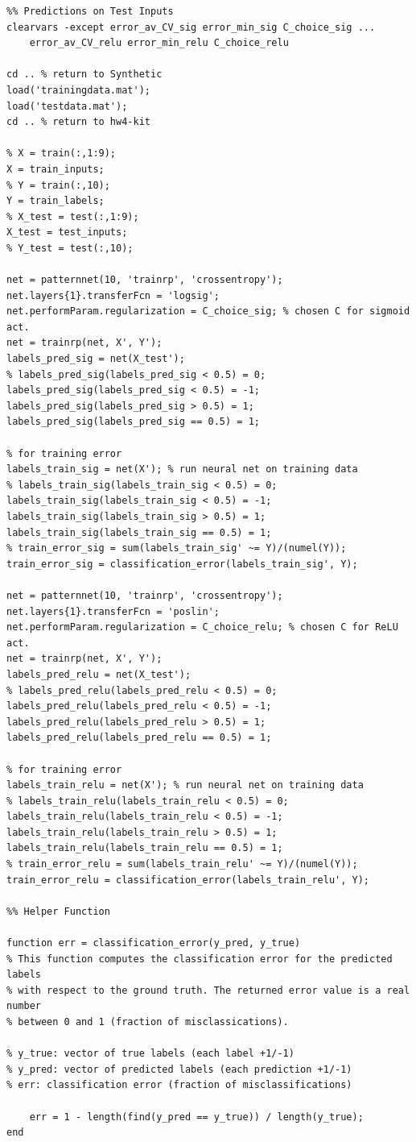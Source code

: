 \documentclass[english]{article}
\begin{document}
\begin{verbatim}
%% Predictions on Test Inputs
clearvars -except error_av_CV_sig error_min_sig C_choice_sig ...
    error_av_CV_relu error_min_relu C_choice_relu

cd .. % return to Synthetic
load('trainingdata.mat');
load('testdata.mat');
cd .. % return to hw4-kit

% X = train(:,1:9);
X = train_inputs;
% Y = train(:,10);
Y = train_labels;
% X_test = test(:,1:9);
X_test = test_inputs;
% Y_test = test(:,10);

net = patternnet(10, 'trainrp', 'crossentropy');
net.layers{1}.transferFcn = 'logsig';
net.performParam.regularization = C_choice_sig; % chosen C for sigmoid act.
net = trainrp(net, X', Y'); 
labels_pred_sig = net(X_test');
% labels_pred_sig(labels_pred_sig < 0.5) = 0;
labels_pred_sig(labels_pred_sig < 0.5) = -1;
labels_pred_sig(labels_pred_sig > 0.5) = 1;
labels_pred_sig(labels_pred_sig == 0.5) = 1;

% for training error
labels_train_sig = net(X'); % run neural net on training data
% labels_train_sig(labels_train_sig < 0.5) = 0;
labels_train_sig(labels_train_sig < 0.5) = -1;
labels_train_sig(labels_train_sig > 0.5) = 1;
labels_train_sig(labels_train_sig == 0.5) = 1;
% train_error_sig = sum(labels_train_sig' ~= Y)/(numel(Y));
train_error_sig = classification_error(labels_train_sig', Y);

net = patternnet(10, 'trainrp', 'crossentropy');
net.layers{1}.transferFcn = 'poslin';
net.performParam.regularization = C_choice_relu; % chosen C for ReLU act.
net = trainrp(net, X', Y'); 
labels_pred_relu = net(X_test');
% labels_pred_relu(labels_pred_relu < 0.5) = 0;
labels_pred_relu(labels_pred_relu < 0.5) = -1;
labels_pred_relu(labels_pred_relu > 0.5) = 1;
labels_pred_relu(labels_pred_relu == 0.5) = 1;

% for training error
labels_train_relu = net(X'); % run neural net on training data
% labels_train_relu(labels_train_relu < 0.5) = 0;
labels_train_relu(labels_train_relu < 0.5) = -1;
labels_train_relu(labels_train_relu > 0.5) = 1;
labels_train_relu(labels_train_relu == 0.5) = 1;
% train_error_relu = sum(labels_train_relu' ~= Y)/(numel(Y));
train_error_relu = classification_error(labels_train_relu', Y);

%% Helper Function

function err = classification_error(y_pred, y_true)
% This function computes the classification error for the predicted labels
% with respect to the ground truth. The returned error value is a real number
% between 0 and 1 (fraction of misclassications).

% y_true: vector of true labels (each label +1/-1)
% y_pred: vector of predicted labels (each prediction +1/-1)
% err: classification error (fraction of misclassifications)

	err = 1 - length(find(y_pred == y_true)) / length(y_true);
end
\end{verbatim}
\end{document}
